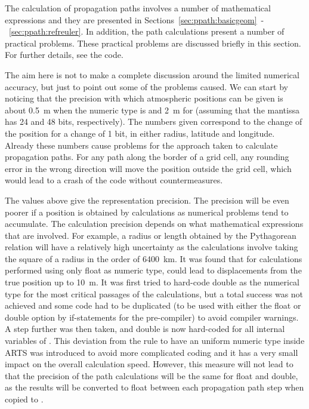 \label{sec:ppath:comments}

The calculation of propagation paths involves a number of mathematical
expressions and they are presented in
Sections~\ref{sec:ppath:basicgeom}~-~\ref{sec:ppath:refreuler}. In
addition, the path calculations present a number of practical
problems. These practical problems are discussed briefly in this
section. For further details, see the code.



The aim here is not to make a complete discussion around the limited
numerical accuracy, but just to point out some of the problems caused.
We can start by noticing that the precision with which atmospheric
positions can be given is about 0.5~m when the numeric type is
 and 2~m for 
(assuming that the mantissa has 24 and 48 bits, respectively). The
numbers given correspond to the change of the position for a change of
1 bit, in either radius, latitude and longitude. Already these numbers
cause problems for the approach taken to calculate propagation paths.
For any path along the border of a grid cell, any rounding error in
the wrong direction will move the position outside the grid cell,
which would lead to a crash of the code without countermeasures.

The values above give the representation precision. The precision will
be even poorer if a position is obtained by calculations as numerical
problems tend to accumulate. The calculation precision depends on what
mathematical expressions that are involved.  For example, a radius or
length obtained by the Pythagorean relation will have a relatively
high uncertainty as the calculations involve taking the square of a
radius in the order of 6400~km. It was found that for calculations
performed using only float as numeric type, could lead to
displacements from the true position up to 10~m. It was first tried to
hard-code double as the numerical type for the most critical passages
of the calculations, but a total success was not achieved and some
code had to be duplicated (to be used with either the float or double
option by if-statements for the pre-compiler) to avoid compiler
warnings. A step further was then taken, and double is now hard-coded
for all internal variables of . This deviation
from the rule to have an uniform numeric type inside ARTS was
introduced to avoid more complicated coding and it has a very small
impact on the overall calculation speed. However, this measure will
not lead to that the precision of the path calculations will be the
same for float and double, as the results will be converted to float
between each propagation path step when copied to
.

